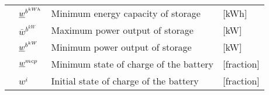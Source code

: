 \begin{longtable}{llll}
&$\underline{w}^{b^{kWh}}$   & Minimum energy capacity of storage                               &[kWh]\\
&$\bar{w}^{b^{kW}}$         & Maximum power output of storage                               &[kW]\\
&$\underline{w}^{b^{kW}}$    & Minimum power output of storage                               &[kW]\\
&$\underline{w}^{mcp}$       & Minimum state of charge of the battery                 &[fraction]\\
&$w^i$                      & Initial state of charge of the battery                &[fraction]\\
\end{longtable}

